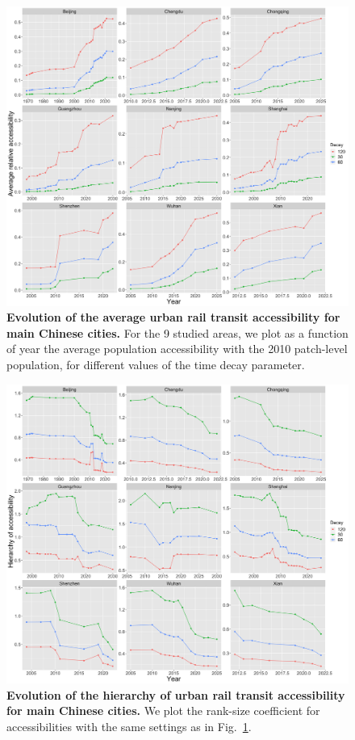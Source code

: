 \begin{figure}
	\includegraphics[width=\textwidth]{figures/avgaccess_facet.png}
	\caption{\textbf{Evolution of the average urban rail transit accessibility for main Chinese cities.} For the 9 studied areas, we plot as a function of year the average population accessibility with the 2010 patch-level population, for different values of the time decay parameter.\label{fig:tcaccessavg}}
\end{figure}


\begin{figure}
	\includegraphics[width=\textwidth]{figures/accesshierarchy_facet.png}
	\caption{\textbf{Evolution of the hierarchy of urban rail transit accessibility for main Chinese cities.} We plot the rank-size coefficient for accessibilities with the same settings as in Fig.~\ref{fig:tcaccessavg}.\label{fig:tcaccesshierarchy}}
\end{figure}


